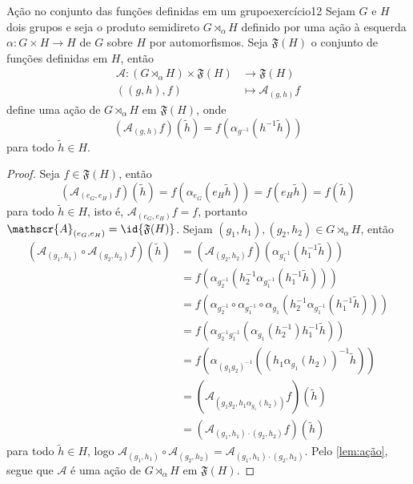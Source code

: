 \begin{proposition}{Ação no conjunto das funções definidas em um grupo}{exercício12}
    Sejam \(G\) e \(H\) dois grupos e seja o produto semidireto \(G \rtimes_{\alpha} H\) definido por uma ação à esquerda \(\alpha : G \times H \to H\) de \(G\) sobre \(H\) por automorfismos. Seja \(\mathfrak{F}(H)\) o conjunto de funções definidas em \(H\), então
    \begin{align*}
        \mathscr{A} : (G \rtimes_{\alpha} H) \times \mathfrak{F}(H) &\to \mathfrak{F}(H)\\
                                                          ((g,h),f) &\mapsto \mathscr{A}_{(g,h)}f
    \end{align*}
    define uma ação de \(G \rtimes_{\alpha} H\) em \(\mathfrak{F}(H)\), onde
    \begin{equation*}
        \left(\mathscr{A}_{(g,h)}f\right)(\tilde{h}) = f\left(\alpha_{g^{-1}}(h^{-1}\tilde{h})\right)
    \end{equation*}
    para todo \(\tilde{h} \in H\).
\end{proposition}
\begin{proof}
    Seja \(f \in \mathfrak{F}(H)\), então
    \begin{equation*}
        \left(\mathscr{A}_{(e_G, e_H)}f\right)(\tilde{h}) = f\left(\alpha_{e_G}(e_H \tilde{h})\right) = f(e_H \tilde{h}) = f(\tilde{h})
    \end{equation*}
    para todo \(\tilde{h} \in H\), isto é, \(\mathscr{A}_{(e_G, e_H)}f = f\), portanto \(\mathscr{A}_{(e_G, e_H)} = \id{\mathfrak{F}(H)}\). Sejam \((g_1, h_1), (g_2, h_2) \in G \rtimes_{\alpha} H\), então
    \begin{align*}
        \left(\mathscr{A}_{(g_1,h_1)} \circ \mathscr{A}_{(g_2, h_2)}f\right)(\tilde{h})
        &= \left(\mathscr{A}_{(g_2, h_2)}f\right)\left(\alpha_{g_1^{-1}}(h_1^{-1}\tilde{h})\right)\\
        &= f\left(\alpha_{g_2^{-1}}\left(h_2^{-1} \alpha_{g_1^{-1}}(h_1^{-1} \tilde{h})\right)\right)\\
        &= f\left(\alpha_{g_2^{-1}} \circ \alpha_{g_1^{-1}} \circ \alpha_{g_1} \left(h_2^{-1} \alpha_{g_1^{-1}}(h_1^{-1} \tilde{h})\right)\right)\\
        &= f\left(\alpha_{g_2^{-1} g_1^{-1}}\left(\alpha_{g_1}(h_2^{-1}) h_1^{-1} \tilde{h}\right)\right)\\
        &= f\left(\alpha_{(g_1 g_2)^{-1}}\left((h_1 \alpha_{g_1}(h_2))^{-1} \tilde{h}\right)\right)\\
        &= \left(\mathscr{A}_{(g_1g_2, h_1 \alpha_{g_1}(h_2))}f\right)(\tilde{h})\\
        &= \left(\mathscr{A}_{(g_1, h_1)\cdot(g_2, h_2)}f\right)(\tilde{h})
    \end{align*}
    para todo \(\tilde{h} \in H\), logo \(\mathscr{A}_{(g_1, h_1)} \circ \mathscr{A}_{(g_2, h_2)} = \mathscr{A}_{(g_1, h_1)\cdot (g_2, h_2)}\). Pelo \cref{lem:ação}, segue que \(\mathscr{A}\) é uma ação de \(G \rtimes_{\alpha} H\) em \(\mathfrak{F}(H)\).
\end{proof}
